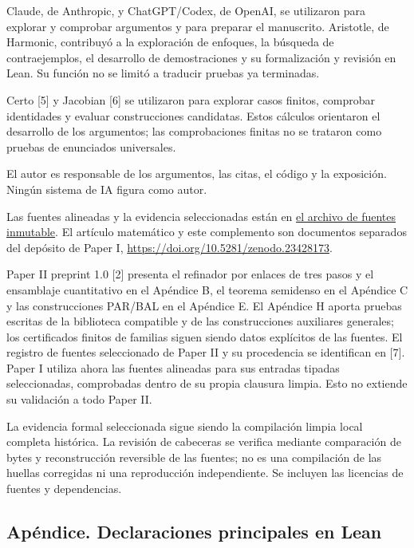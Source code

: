 \documentclass[spanish,11pt,a4paper]{article}
\begin{document}
Claude, de Anthropic, y ChatGPT/Codex, de OpenAI, se utilizaron para explorar y comprobar argumentos y para preparar el manuscrito. Aristotle, de Harmonic, contribuyó a la exploración de enfoques, la búsqueda de contraejemplos, el desarrollo de demostraciones y su formalización y revisión en Lean. Su función no se limitó a traducir pruebas ya terminadas.

Certo {[}5{]} y Jacobian {[}6{]} se utilizaron para explorar casos finitos, comprobar identidades y evaluar construcciones candidatas. Estos cálculos orientaron el desarrollo de los argumentos; las comprobaciones finitas no se trataron como pruebas de enunciados universales.

El autor es responsable de los argumentos, las citas, el código y la exposición. Ningún sistema de IA figura como autor.

Las fuentes alineadas y la evidencia seleccionadas están en \href{https://github.com/jtraverso/nash-williams-triangle-decompositions-release/blob/0d652cde7d8d1f58cb6dd264b30fd3e6dc60f4f7/archives/PAPER_I_LEAN_20261020_ALIGNED_v3.zip}{el archivo de fuentes inmutable}. El artículo matemático y este complemento son documentos separados del depósito de Paper I, \url{https://doi.org/10.5281/zenodo.23428173}.

Paper II preprint 1.0 {[}2{]} presenta el refinador por enlaces de tres pasos y el ensamblaje cuantitativo en el Apéndice B, el teorema semidenso en el Apéndice C y las construcciones PAR/BAL en el Apéndice E. El Apéndice H aporta pruebas escritas de la biblioteca compatible y de las construcciones auxiliares generales; los certificados finitos de familias siguen siendo datos explícitos de las fuentes. El registro de fuentes seleccionado de Paper II y su procedencia se identifican en {[}7{]}. Paper I utiliza ahora las fuentes alineadas para sus entradas tipadas seleccionadas, comprobadas dentro de su propia clausura limpia. Esto no extiende su validación a todo Paper II.

La evidencia formal seleccionada sigue siendo la compilación limpia local completa histórica. La revisión de cabeceras se verifica mediante comparación de bytes y reconstrucción reversible de las fuentes; no es una compilación de las huellas corregidas ni una reproducción independiente. Se incluyen las licencias de fuentes y dependencias.

\subsection{Apéndice. Declaraciones principales en Lean}\label{apuxe9ndice.-declaraciones-principales-en-lean}
\end{document}
